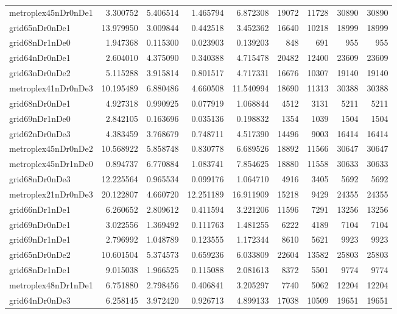 \begin{longtable}{|l|r|r|r|r|r|r|r|r|}
metroplex45nDr0nDe1 & 3.300752 & 5.406514 & 1.465794 & 6.872308 & 19072 & 11728 & 30890 & 30890 \\
grid65nDr0nDe1 & 13.979950 & 3.009844 & 0.442518 & 3.452362 & 16640 & 10218 & 18999 & 18999 \\
grid68nDr1nDe0 & 1.947368 & 0.115300 & 0.023903 & 0.139203 & 848 & 691 & 955 & 955 \\
grid64nDr0nDe1 & 2.604010 & 4.375090 & 0.340388 & 4.715478 & 20482 & 12400 & 23609 & 23609 \\
grid63nDr0nDe2 & 5.115288 & 3.915814 & 0.801517 & 4.717331 & 16676 & 10307 & 19140 & 19140 \\
metroplex41nDr0nDe3 & 10.195489 & 6.880486 & 4.660508 & 11.540994 & 18690 & 11313 & 30388 & 30388 \\
grid68nDr0nDe1 & 4.927318 & 0.990925 & 0.077919 & 1.068844 & 4512 & 3131 & 5211 & 5211 \\
grid69nDr1nDe0 & 2.842105 & 0.163696 & 0.035136 & 0.198832 & 1354 & 1039 & 1504 & 1504 \\
grid62nDr0nDe3 & 4.383459 & 3.768679 & 0.748711 & 4.517390 & 14496 & 9003 & 16414 & 16414 \\
metroplex45nDr0nDe2 & 10.568922 & 5.858748 & 0.830778 & 6.689526 & 18892 & 11566 & 30647 & 30647 \\
metroplex45nDr1nDe0 & 0.894737 & 6.770884 & 1.083741 & 7.854625 & 18880 & 11558 & 30633 & 30633 \\
grid68nDr0nDe3 & 12.225564 & 0.965534 & 0.099176 & 1.064710 & 4916 & 3405 & 5692 & 5692 \\
metroplex21nDr0nDe3 & 20.122807 & 4.660720 & 12.251189 & 16.911909 & 15218 & 9429 & 24355 & 24355 \\
grid66nDr1nDe1 & 6.260652 & 2.809612 & 0.411594 & 3.221206 & 11596 & 7291 & 13256 & 13256 \\
grid69nDr0nDe1 & 3.022556 & 1.369492 & 0.111763 & 1.481255 & 6222 & 4189 & 7104 & 7104 \\
grid69nDr1nDe1 & 2.796992 & 1.048789 & 0.123555 & 1.172344 & 8610 & 5621 & 9923 & 9923 \\
grid65nDr0nDe2 & 10.601504 & 5.374573 & 0.659236 & 6.033809 & 22604 & 13582 & 25803 & 25803 \\
grid68nDr1nDe1 & 9.015038 & 1.966525 & 0.115088 & 2.081613 & 8372 & 5501 & 9774 & 9774 \\
metroplex48nDr1nDe1 & 6.751880 & 2.798456 & 0.406841 & 3.205297 & 7740 & 5062 & 12204 & 12204 \\
grid64nDr0nDe3 & 6.258145 & 3.972420 & 0.926713 & 4.899133 & 17038 & 10509 & 19651 & 19651 \\

\end{longtable}
